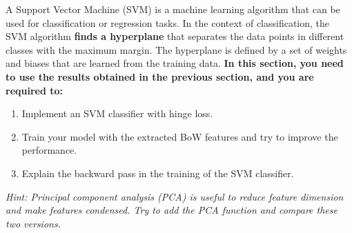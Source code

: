 \documentclass[]{article}
\begin{document}
A Support Vector Machine (SVM) is a machine learning algorithm that can be used for classification or regression tasks. In the context of classification, the SVM algorithm \textbf{finds a hyperplane} that separates the data points in different classes with the maximum margin. The hyperplane is defined by a set of weights and biases that are learned from the training data. \textbf{In this section, you need to use the results obtained in the previous section, and you are required to:}

\begin{enumerate}
    \item Implement an SVM classifier with hinge loss.
    \item Train your model with the extracted BoW features and try to improve the performance.
    \item Explain the backward pass in the training of the SVM classifier.
\end{enumerate} 

\emph{Hint: Principal component analysis (PCA) is useful to reduce feature dimension and make features condensed. Try to add the PCA function and compare these two versions.}

~\\
~\\
~\\
~\\

\newpage
\end{document}
